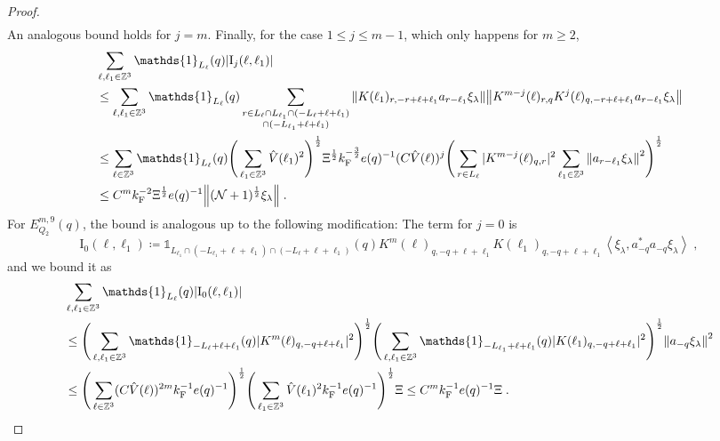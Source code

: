 \documentclass[12pt,a4paper]{article}
\numberwithin{equation}{section}
\newcommand{\1}{\mathbb{I}}
\newcommand{\F}{\mathrm{F}}
\newcommand{\I}{\mathrm{I}}
\newcommand{\Zstar}{\mathbb{Z}^3} %
\newcommand{\Z}{\mathbb{Z}}
\newcommand{\NN}{\mathcal{N}}
\newcommand{\half}{\frac{1}{2}}
\newcommand{\eva}[1]{\left\langle #1 \right\rangle}
\theoremstyle{plain}
\theoremstyle{definition}
\theoremstyle{remark}
\theoremstyle{plain}
\theoremstyle{definition}
\theoremstyle{remark}
\begin{document}
\begin{proof}
\begin{align}
\end{align}
An analogous bound holds for $ j = m $. Finally, for the case $ 1 \le j \le m-1 $, which only happens for $ m \ge 2 $,
\begin{align}
	&\sum_{\ell,\ell_1 \in \Zstar} \mathds{1}_{L_\ell}(q) |\I_j(\ell, \ell_1)| \nonumber\\
	&\leq \sum_{\ell,\ell_1 \in \Zstar} \mathds{1}_{L_\ell}(q) \sum\limits_{\substack{r\in L_{\ell} \cap L_{\ell_1} \cap (-L_{\ell}+\ell+\ell_1) \\ \cap (-L_{\ell_1}+\ell+\ell_1)}} \norm{ K(\ell_1)_{r,-r+\ell+\ell_1} a_{r-\ell_1} \xi_\lambda} \norm{ K^{m-j}(\ell)_{r,q} K^j(\ell)_{q,-r+\ell+\ell_1} a_{r-\ell_1} \xi_\lambda} \nonumber\\
	&\leq \sum_{\ell \in \Zstar} \mathds{1}_{L_\ell}(q)
		\Bigg( \sum_{\ell_1 \in \Zstar} \hat{V}(\ell_1)^2 \Bigg)^{\half}
		\Xi^{\half} k_{\F}^{-\frac 32} e(q)^{-1} (C \hat{V}(\ell))^j
		\Bigg( \sum_{r \in L_{\ell}} |K^{m-j}(\ell)_{q,r}|^2 
		\sum_{\ell_1 \in \Z^3} \norm{a_{r-\ell_1} \xi_\lambda}^2 \Bigg)^{\half} \nonumber\\
	&\leq C^m k_{\F}^{-2} \Xi^{\half} e(q)^{-1} \norm{(\NN+1)^{\half} \xi_\lambda} \;. \label{eq:estEQ2182}
\end{align}
For $ E^{m,9}_{Q_2}(q) $, the bound is analogous up to the following modification: The term for $ j = 0 $ is
\begin{equation}
	\I_0(\ell,\ell_1)
	\coloneq \mathds{1}_{L_{\ell_1} \cap (-L_{\ell_1} + \ell+\ell_1) \cap (-L_\ell + \ell+\ell_1)}(q)
		K^m(\ell)_{q,-q+\ell+\ell_1}
		K(\ell_1)_{q,-q+\ell+\ell_1}
		\eva{\xi_\lambda, a_{-q}^* a_{-q} \xi_\lambda} \;,
\end{equation}
and we bound it as
\begin{align}
	&\sum_{\ell,\ell_1 \in \Zstar} \mathds{1}_{L_\ell}(q) |\I_0(\ell,\ell_1)| \nonumber\\
	&\leq \Bigg( \sum_{\ell, \ell_1 \in \Zstar} \mathds{1}_{-L_\ell + \ell+\ell_1}(q) |K^m(\ell)_{q,-q+\ell+\ell_1}|^2 \Bigg)^{\half}
		\Bigg( \sum_{\ell, \ell_1 \in \Zstar} \mathds{1}_{-L_{\ell_1} + \ell+\ell_1}(q) |K(\ell_1)_{q,-q+\ell+\ell_1}|^2 \Bigg)^{\half}
	\norm{ a_{-q} \xi_\lambda }^2 \nonumber\\
	&\leq \Bigg( \sum_{\ell\in \Zstar} (C \hat{V}(\ell))^{2m} k_{\F}^{-1} e(q)^{-1} \Bigg)^{\half}
		\Bigg( \sum_{\ell_1 \in \Zstar} \hat{V}(\ell_1)^2 k_{\F}^{-1} e(q)^{-1} \Bigg)^{\half}
	\Xi
	\leq C^m
		k_{\F}^{-1} e(q)^{-1} \Xi \;.\label{eq:estEQ2181_bis}
\end{align}
\end{proof}
\end{document}

